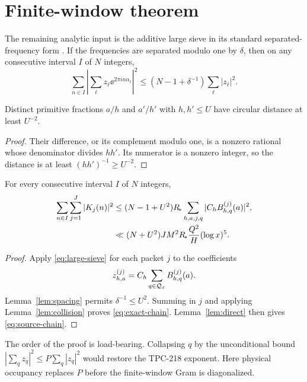 \section{Finite-window theorem}

The remaining analytic input is the additive large sieve in its standard separated-
frequency form \citep{MontgomeryVaughan1973}.  If the frequencies are separated
modulo one by $\delta$, then on any consecutive interval $I$ of $N$ integers,
\begin{equation}
 \sum_{n\in I}\left|\sum_\ell z_\ell\ee^{2\pi i n\alpha_\ell}\right|^2
 \le (N-1+\delta^{-1})\sum_\ell|z_\ell|^2.           \label{eq:large-sieve}
\end{equation}

\begin{lemma}\label{lem:spacing}
Distinct primitive fractions $a/h$ and $a'/h'$ with $h,h'\le U$ have circular
distance at least $U^{-2}$.
\end{lemma}

\begin{proof}
Their difference, or its complement modulo one, is a nonzero rational whose
denominator divides $hh'$.  Its numerator is a nonzero integer, so the distance is
at least $(hh')^{-1}\ge U^{-2}$.
\end{proof}

\begin{theorem}
\label{thm:finite-window}
For every consecutive interval $I$ of $N$ integers,
\begin{align}
 \sum_{n\in I}\sum_{j=1}^J|K_j(n)|^2
 &\le (N-1+U^2)R_{\!*}
 \sum_{h,a,j,q}|C_hB_{h,q}^{(j)}(a)|^2,              \label{eq:exact-chain}\\
 &\ll (N+U^2)JM^2R_{\!*}\frac{Q^2}{H}(\log x)^5.
                                                                    \label{eq:source-chain}
\end{align}
\end{theorem}

\begin{proof}
Apply \eqref{eq:large-sieve} for each packet $j$ to the coefficients
\[
 z_{h,a}^{(j)}=C_h\sum_{q\in\mathcal Q_x}B_{h,q}^{(j)}(a).
\]
Lemma~\ref{lem:spacing} permits $\delta^{-1}\le U^2$.  Summing in $j$ and applying
Lemma~\ref{lem:collision} proves \eqref{eq:exact-chain}.  Lemma~\ref{lem:direct}
then gives \eqref{eq:source-chain}.
\end{proof}

The order of the proof is load-bearing.  Collapsing $q$ by the unconditional bound
$|\sum_qz_q|^2\le P\sum_q|z_q|^2$ would restore the TPC-218 exponent.  Here physical
occupancy replaces $P$ before the finite-window Gram is diagonalized.
